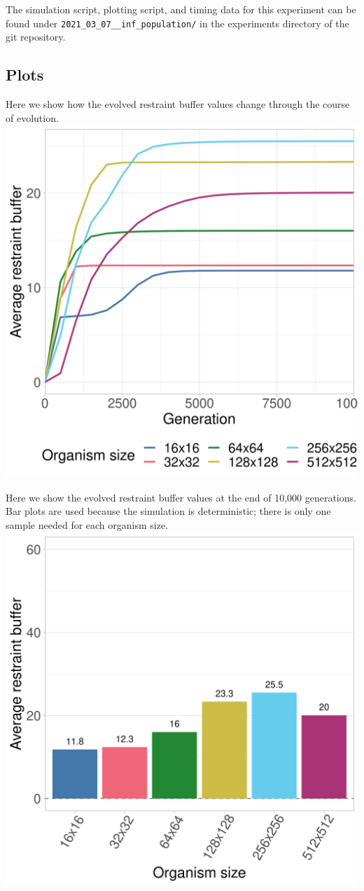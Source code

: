 \documentclass[
]{book}
\begin{document}
The simulation script, plotting script, and timing data for this experiment can be found under \texttt{2021\_03\_07\_\_inf\_population/} in the experiments directory of the git repository.

\hypertarget{plots}{%
\subsection{Plots}\label{plots}}

Here we show how the evolved restraint buffer values change through the course of evolution.
\includegraphics{./inf_pop/over_time.png}

Here we show the evolved restraint buffer values at the end of 10,000 generations.
Bar plots are used because the simulation is deterministic; there is only one sample needed for each organism size.
\includegraphics{./inf_pop/evolved_bars.png}
\end{document}
